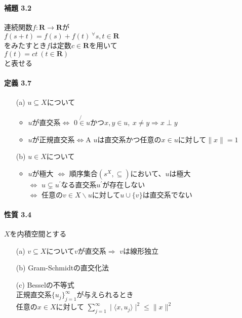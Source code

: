 \documentclass[12pt,a4paper]{article}
\begin{document}
  \paragraph{補題 3.2}
    連続関数$f: \mathbf{R} \rightarrow \mathbf{R}$が \\
    $f(s+t) = f(s) + f(t) \ {}^\forall s, t \in \mathbf{R}$ \\
    をみたすとき$f$は定数$c \in \mathbf{R}$を用いて \\
    $f(t) = ct \ (t \in \mathbf{R}) $ \\
    と表せる
  
  \paragraph{定義 3.7}
    \begin{itemize}
      \item[(a)] $u \subseteq X$について
        \begin{itemize}
          \item $u$が直交系$\Leftrightarrow$ $0 \not{\in} u$かつ$x,y \in u, \ x \neq y \Rightarrow x \perp y$
          \item $u$が正規直交系$\Leftrightarrow$A $u$は直交系かつ任意の$x \in u$に対して$\parallel x \parallel = 1$
        \end{itemize}
      \item[(b)] $u \in X$について
        \begin{itemize}
          \item $u$が極大 $\Leftrightarrow$ 順序集合$(s^X, \subseteq)$において、$u$は極大 \\
            $\Leftrightarrow$ $u \subsetneq u^\prime$なる直交系$u^\prime$が存在しない \\
            $\Leftrightarrow$ 任意の$v \in X \backslash u$に対して$u \cup \lbrace v \rbrace$は直交系でない
        \end{itemize}
    \end{itemize}

  \paragraph{性質 3.4}
    $X$を内積空間とする
    \begin{itemize}
      \item[(a)] $v \subseteq X$について$v$が直交系$\Rightarrow$ $v$は線形独立 
      \item[(b)] Gram-Schmidtの直交化法
      \item[(c)] Besselの不等式 \\
        正規直交系$\lbrace u_j \rbrace_{j=1}^\infty$が与えられるとき \\
        任意の$x \in X$に対して $\sum_{j=1}^\infty \mid \langle x, u_j \rangle \mid^2 \leq \parallel x \parallel^2$
    \end{itemize}
\end{document}
